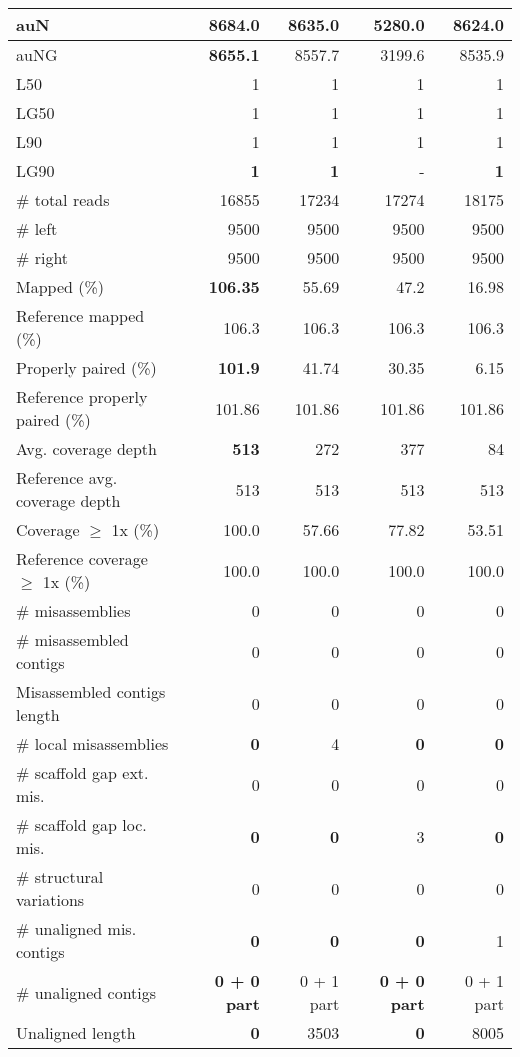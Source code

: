 \documentclass[12pt,a4paper]{article}
\begin{document}
\begin{table}[ht]
\begin{center}
\begin{tabular}{|l*{4}{|r}|}
auN & {\bf 8684.0} & 8635.0 & 5280.0 & 8624.0 \\ \hline
auNG & {\bf 8655.1} & 8557.7 & 3199.6 & 8535.9 \\ \hline
L50 & 1 & 1 & 1 & 1 \\ \hline
LG50 & 1 & 1 & 1 & 1 \\ \hline
L90 & 1 & 1 & 1 & 1 \\ \hline
LG90 & {\bf 1} & {\bf 1} & - & {\bf 1} \\ \hline
\# total reads & 16855 & 17234 & 17274 & 18175 \\ \hline
\# left & 9500 & 9500 & 9500 & 9500 \\ \hline
\# right & 9500 & 9500 & 9500 & 9500 \\ \hline
Mapped (\%) & {\bf 106.35} & 55.69 & 47.2 & 16.98 \\ \hline
Reference mapped (\%) & 106.3 & 106.3 & 106.3 & 106.3 \\ \hline
Properly paired (\%) & {\bf 101.9} & 41.74 & 30.35 & 6.15 \\ \hline
Reference properly paired (\%) & 101.86 & 101.86 & 101.86 & 101.86 \\ \hline
Avg. coverage depth & {\bf 513} & 272 & 377 & 84 \\ \hline
Reference avg. coverage depth & 513 & 513 & 513 & 513 \\ \hline
Coverage $\geq$ 1x (\%) & 100.0 & 57.66 & 77.82 & 53.51 \\ \hline
Reference coverage $\geq$ 1x (\%) & 100.0 & 100.0 & 100.0 & 100.0 \\ \hline
\# misassemblies & 0 & 0 & 0 & 0 \\ \hline
\# misassembled contigs & 0 & 0 & 0 & 0 \\ \hline
Misassembled contigs length & 0 & 0 & 0 & 0 \\ \hline
\# local misassemblies & {\bf 0} & 4 & {\bf 0} & {\bf 0} \\ \hline
\# scaffold gap ext. mis. & 0 & 0 & 0 & 0 \\ \hline
\# scaffold gap loc. mis. & {\bf 0} & {\bf 0} & 3 & {\bf 0} \\ \hline
\# structural variations & 0 & 0 & 0 & 0 \\ \hline
\# unaligned mis. contigs & {\bf 0} & {\bf 0} & {\bf 0} & 1 \\ \hline
\# unaligned contigs & {\bf 0 + 0 part} & 0 + 1 part & {\bf 0 + 0 part} & 0 + 1 part \\ \hline
Unaligned length & {\bf 0} & 3503 & {\bf 0} & 8005 \\ \hline

\end{tabular}
\end{center}
\end{table}
\end{document}

